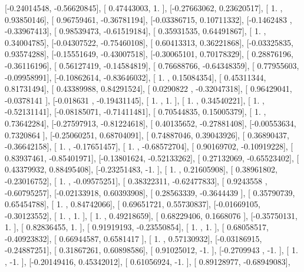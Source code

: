 \documentclass{article}
\begin{document}
       [-0.24014548, -0.56620845],
       [ 0.47443003,  1.        ],
       [-0.27663062,  0.23620517],
       [ 1.        ,  0.93850146],
       [ 0.96759461, -0.36781194],
       [-0.03386715,  0.10711332],
       [-0.1462483 , -0.33967413],
       [ 0.98539473, -0.61519184],
       [ 0.35931535,  0.64491867],
       [ 1.        ,  0.34004785],
       [-0.04307522, -0.75460108],
       [ 0.60413313,  0.36221868],
       [-0.03325835,  0.93574288],
       [-0.15551649, -0.43007518],
       [-0.30065101,  0.70178329],
       [ 0.28876196, -0.36116196],
       [ 0.56127419, -0.14584819],
       [ 0.76688766, -0.64348359],
       [ 0.77955603, -0.09958991],
       [-0.10862614, -0.83646032],
       [ 1.        ,  0.15084354],
       [ 0.45311344,  0.81731494],
       [ 0.43389988,  0.84291524],
       [ 0.0290822 , -0.32047318],
       [ 0.96429041, -0.0378141 ],
       [-0.018631  , -0.19431145],
       [ 1.        ,  1.        ],
       [ 1.        ,  0.34540221],
       [ 1.        , -0.52131141],
       [-0.08185071, -0.71411481],
       [ 0.70544835,  0.15005379],
       [ 1.        ,  0.73642284],
       [-0.27597913, -0.81224618],
       [ 0.40135652, -0.27881408],
       [-0.00553634,  0.7320864 ],
       [-0.25060251,  0.68704091],
       [ 0.74887046,  0.39043926],
       [ 0.36890437, -0.36642158],
       [ 1.        , -0.17651457],
       [ 1.        , -0.68572704],
       [ 0.90169702, -0.10919228],
       [ 0.83937461, -0.85401971],
       [-0.13801624, -0.52133262],
       [ 0.27132069, -0.65523402],
       [ 0.43379932,  0.88495408],
       [-0.23251483, -1.        ],
       [ 1.        ,  0.21605908],
       [ 0.38961802, -0.23016752],
       [ 1.        , -0.09575251],
       [ 0.38322311, -0.62477833],
       [ 0.9243558 , -0.60795257],
       [-0.02133918,  0.60393908],
       [ 0.28563339, -0.3644439 ],
       [ 0.35790739,  0.65454788],
       [ 1.        ,  0.84742066],
       [ 0.69651721,  0.55730837],
       [-0.01669105, -0.30123552],
       [ 1.        ,  1.        ],
       [ 1.        ,  0.49218659],
       [ 0.68229406,  0.1668076 ],
       [-0.35750131,  1.        ],
       [ 0.82836455,  1.        ],
       [ 0.91919193, -0.23550854],
       [ 1.        ,  1.        ],
       [ 0.68058517, -0.40923832],
       [ 0.66944587,  0.6581417 ],
       [ 1.        ,  0.57130932],
       [-0.03186915, -0.24887251],
       [ 0.31867261,  0.60898586],
       [ 0.91025012, -1.        ],
       [-0.2709943 , -1.        ],
       [ 1.        , -1.        ],
       [-0.20149416,  0.45342012],
       [ 0.61056924, -1.        ],
       [ 0.89128977, -0.68949083],
\end{document}
